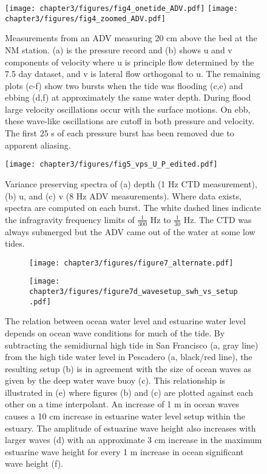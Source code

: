 \begin{figure}
\texttt{[image: chapter3/figures/fig4\_onetide\_ADV.pdf]}
\texttt{[image: chapter3/figures/fig4\_zoomed\_ADV.pdf]}
\protect\caption{Measurements from an ADV measuring 20 cm above the bed at the NM station.
(a) is the pressure record and (b) shows u and v components of velocity
where u is principle flow determined by the 7.5 day dataset, and v
is lateral flow orthogonal to u. The remaining plots (c-f) show two
bursts when the tide was flooding (c,e) and ebbing (d,f) at approximately
the same water depth. During flood large velocity oscillations occur
with the surface motions. On ebb, these wave-like oscillations are
cutoff in both pressure and velocity. The first 25 s of each pressure
burst has been removed due to apparent aliasing. \label{f5_adv}}
\end{figure}


\begin{figure}
\centering
\texttt{[image: chapter3/figures/fig5\_vps\_U\_P\_edited.pdf]}

\protect\caption{Variance preserving spectra of (a) depth (1 Hz CTD measurement), (b)
u, and (c) v (8 Hz ADV measurements). Where data exists, spectra are
computed on each burst. The white dashed lines indicate the infragravity
frequency limits of $\frac{1}{300}$ Hz to $\frac{1}{30}$ Hz. The
CTD was always submerged but the ADV came out of the water at some
low tides. \label{f6_spectra}}
\end{figure}


\begin{figure}
\begin{subfigure}{.666\textwidth}
	\centering
\texttt{[image: chapter3/figures/figure7\_alternate.pdf]}
\end{subfigure}
\begin{subfigure}{.333\textwidth}
\texttt{[image: chapter3/figures/figure7d\_wavesetup\_swh\_vs\_setup.pdf]}
\end{subfigure}
\protect\caption{The relation between ocean water level and estuarine water level depends on ocean wave conditions for much of the tide. By subtracting the
semidiurnal high tide in San Francisco (a, gray line) from the high
tide water level in Pescadero (a, black/red line), the resulting setup
(b) is in agreement with the size of ocean waves as given by the deep
water wave buoy (c). This relationship is illustrated in (e) where
figures (b) and (c) are plotted against each other on a time interpolant.
An increase of 1 m in ocean waves causes a 10 cm increase in estuarine
water level setup within the estuary. The amplitude of estuarine wave
height also increases with larger waves (d) with an approximate 3
cm increase in the maximum estuarine wave height for every 1 m increase
in ocean significant wave height (f). \label{f7_setup}}
\end{figure}


